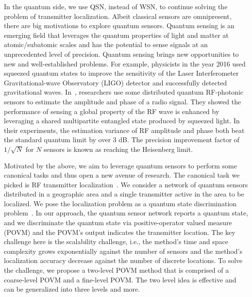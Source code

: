 In the quantum side, we use QSN, instead of WSN, to continue solving the problem of transmitter localization.
Albeit classical sensors are omnipresent, there are big motivations to explore quantum sensors.
Quantum sensing is an emerging field that leverages the quantum properties of light and matter at atomic/subatomic scales and has the potential to sense signals at an unprecedented level of precision.
Quantum sensing brings new opportunities to new and well-established problems.
For example, physicists in the year 2016 used squeezed quantum states to improve the sensitivity of the Laser Interferometer Gravitational-wave Observatory (LIGO) detector and successfully detected gravitational waves.
In~\cite{PRL20-qsn}, researchers use some distributed quantum RF-photonic sensors to estimate the amplitude and phase of a radio signal.
They showed the performance of sensing a global property of the RF wave is enhanced by leveraging a shared multipartite entangled state produced by squeezed light.
In their experiments, the estimation variance of RF amplitude and phase both beat the standard quantum limit by over 3 dB.
The precision improvement factor of $1/\sqrt{N}$ for $N$ sensors is known as reaching the Heisenberg limit.

Motivated by the above, we aim to leverage quantum sensors to perform some canonical tasks and thus open a new avenue of research.
The canonical task we picked is RF transmitter localization~\cite{nsdi13-arraytrack,pmc22-deepmtlpro}.
We consider a network of quantum sensors distributed in a geographic area and a single transmitter active in the area to be localized.
We pose the localization problem as a quantum state discrimination problem~\cite{bergou-review-2007}. 
In our approach, the quantum sensor network reports a quantum state, and we discriminate the quantum state via 
positive-operator valued measure (POVM) and the POVM's output indicates the transmitter location.
The key challenge here is the scalability challenge, i.e., the method's time and space complexity grows exponentially against the
number of sensors and the method's localization accuracy decrease against the number of discrete locations.
To solve the challenge, we propose a two-level POVM method that is comprised of a coarse-level POVM and a fine-level POVM.
The two level idea is effective and can be generalized into three levels and more.

